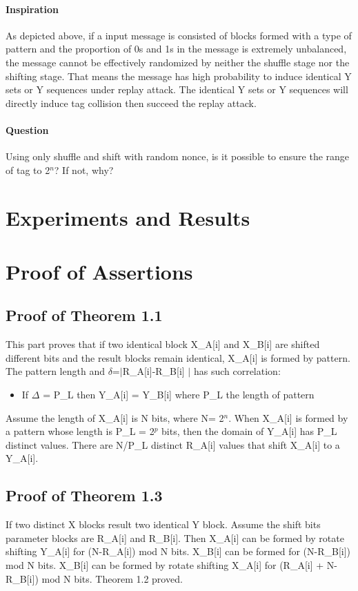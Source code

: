 \documentclass{article}
\begin{document}
\paragraph{Inspiration}
As depicted above, if a input message is consisted of blocks formed with a type of pattern and the proportion of 0s and 1s in the message is extremely unbalanced, the message cannot be effectively randomized by neither the shuffle stage nor the shifting stage. That means the message has high probability to induce identical Y sets or Y sequences under replay attack. The identical Y sets or Y sequences will directly induce tag collision then succeed the replay attack. 
\paragraph{Question}
Using only shuffle and shift with random nonce, is it possible to ensure the range of tag to 2$^n$? If not, why?

\section{Experiments and Results}
\appendix
\section{Proof of Assertions}
\subsection{Proof of Theorem 1.1}
This part proves that if two identical block X\_A[i]  and X\_B[i] are shifted different bits and the result blocks remain identical, X\_A[i] is formed by pattern. The pattern length and $\delta$=$\mid$R\_A[i]-R\_B[i] $\mid$ has such correlation:
\begin{itemize}
	\item If $\Delta$ = P\_L then Y\_A[i] = Y\_B[i] where P\_L the length of pattern
\end{itemize}
Assume the length of X\_A[i] is N bits, where N= 2$^n$. When X\_A[i] is formed by a pattern whose length is P\_L = 2$^p$ bits, then the domain of Y\_A[i] has P\_L distinct values. There are N/P\_L distinct R\_A[i] values that shift X\_A[i] to a Y\_A[i].  

\subsection{Proof of Theorem 1.3}
If two distinct X blocks result two identical Y block. Assume the shift bits parameter blocks are R\_A[i] and R\_B[i]. Then X\_A[i] can be formed by rotate shifting Y\_A[i] for (N-R\_A[i]) mod N bits. X\_B[i] can be formed for (N-R\_B[i]) mod N bits.
X\_B[i] can be formed by rotate shifting X\_A[i] for (R\_A[i] + N-R\_B[i]) mod N bits. Theorem 1.2 proved.
\end{document}
